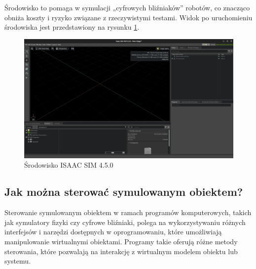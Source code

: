 \documentclass[12pt]{article}
\begin{document}
\noindent Środowisko to pomaga w symulacji „cyfrowych bliźniaków” robotów, co znacząco obniża koszty i ryzyko związane z rzeczywistymi testami. Widok po uruchomieniu środowiska jest przedstawiony na rysunku \ref{srodowiskoISAACSIM}.

\begin{figure}[h]
    \centering
    \includegraphics[width=0.75\linewidth]{Zdjęcia/widokISAACSIM.png}
    \caption{Środowisko ISAAC SIM 4.5.0}
    \label{srodowiskoISAACSIM}
\end{figure}

\clearpage

\subsection{Jak można sterować symulowanym obiektem?}

\noindent Sterowanie symulowanym obiektem w ramach programów komputerowych, takich jak symulatory fizyki czy cyfrowe bliźniaki, polega na wykorzystywaniu różnych interfejsów i narzędzi dostępnych w oprogramowaniu, które umożliwiają manipulowanie wirtualnymi obiektami. Programy takie oferują różne metody sterowania, które pozwalają na interakcję z wirtualnym modelem obiektu lub systemu. \\
\end{document}
